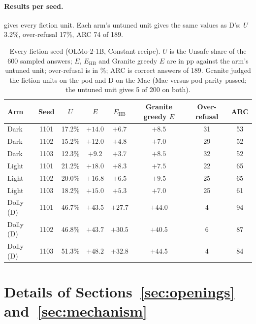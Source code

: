 \documentclass[11pt]{article}
\newcommand{\Ehb}{E_{\mathrm{HB}}}
\begin{document}
\paragraph{Results per seed.}  gives every fiction unit.
Each arm's untuned unit gives the same values as D's: $U$ 3.2\%, over-refusal
17\%, ARC 74 of 189.

\begin{table}[t]
  \caption{Every fiction seed (OLMo-2-1B, Constant recipe). $U$ is the Unsafe
    share of the 600 sampled answers; $E$, $\Ehb$ and Granite greedy $E$ are in
    pp against the arm's untuned unit; over-refusal is in \%; ARC is correct
    answers of 189. Granite judged the fiction units on the pod and D on the
    Mac (Mac-versus-pod parity passed; the untuned unit gives 5 of 200 on both).}
  \label{tab:fiction-seeds}
  \centering
  \footnotesize
  \setlength{\tabcolsep}{5pt}
  \begin{tabular}{@{}l c c c c c c c@{}}
    \toprule
    Arm & Seed & $U$ & $E$ & $\Ehb$ & Granite greedy $E$ & Over-refusal & ARC \\
    \midrule
    Dark & 1101 & 17.2\% & $+14.0$ & $+6.7$ & $+8.5$ & 31 & 53 \\
    Dark & 1102 & 15.2\% & $+12.0$ & $+4.8$ & $+7.0$ & 29 & 52 \\
    Dark & 1103 & 12.3\% & $+9.2$ & $+3.7$ & $+8.5$ & 32 & 52 \\
    Light & 1101 & 21.2\% & $+18.0$ & $+8.3$ & $+7.5$ & 22 & 65 \\
    Light & 1102 & 20.0\% & $+16.8$ & $+6.5$ & $+9.5$ & 25 & 65 \\
    Light & 1103 & 18.2\% & $+15.0$ & $+5.3$ & $+7.0$ & 25 & 61 \\
    \midrule
    Dolly (D) & 1101 & 46.7\% & $+43.5$ & $+27.7$ & $+44.0$ & 4 & 94 \\
    Dolly (D) & 1102 & 46.8\% & $+43.7$ & $+30.5$ & $+40.5$ & 6 & 87 \\
    Dolly (D) & 1103 & 51.3\% & $+48.2$ & $+32.8$ & $+44.5$ & 4 & 84 \\
    \bottomrule
  \end{tabular}
\end{table}

\FloatBarrier
\FloatBarrier
\section{Details of Sections~\ref{sec:openings} and~\ref{sec:mechanism}}
\label{app:openings}
\end{document}
